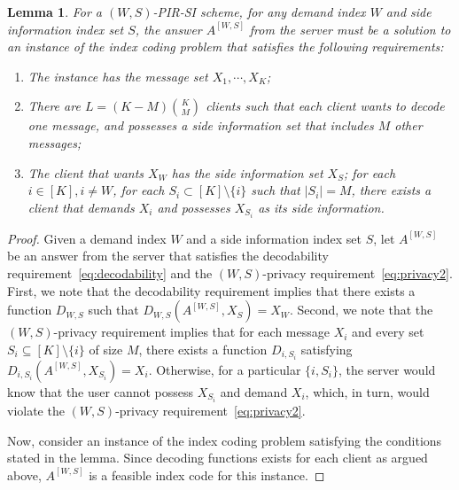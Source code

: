 \documentclass[letterpaper, 10 pt, conference]{ieeeconf}
\newtheorem{lemma}{Lemma}
\newcommand{\Xj}[1]{X_{#1}} %
\newcommand{\A}[2]{A^{[#1,#2]}} %
\begin{document}
\begin{lemma}
\label{lem:WSNecessaryCondition}
For a $(W,S)$-PIR-SI scheme, for any demand index $W$ and side information index set $S$, the answer $\A{W}{S}$ from the server must be a solution to an instance of the index coding problem that satisfies the following requirements:
\begin{enumerate}
	\item The instance has the message set $X_1, \cdots, X_K$;
	\item  There are $L = (K - M)\binom{K}{M}$ clients such that each client wants to decode one message, and possesses a side information set that includes $M$ other messages;
	\item  The client that wants $X_W$ has the side information set $X_S$; for each $i\in[K], i\ne W$, for each $S_i\subset[K]\setminus\{i\}$ such that $|S_i| = M$, there exists a client that demands $X_i$ and possesses $\Xj{S_i}$ as its side information.
\end{enumerate}
\end{lemma}

\begin{proof}
Given a demand index $W$ and a side information index set $S$, let $\A{W}{S}$ be an answer from the server that satisfies the decodability requirement~\eqref{eq:decodability} and the $(W,S)$-privacy requirement~\eqref{eq:privacy2}. First, we note that the decodability requirement implies that there exists a function $D_{W,S}$ such that $D_{W,S}\left(\A{W}{S},\Xj{S}\right) = X_W$. Second, we note that the $(W,S)$-privacy requirement implies that for each message $X_i$ and every set $S_i\subseteq[K]\setminus\{i\}$ of size $M$, there exists a function $D_{i,S_i}$ satisfying $D_{i,S_i}\left(\A{W}{S},\Xj{S_i}\right) = X_i$. Otherwise, for a particular $\{i,S_i\}$, the server would know that the user cannot possess $\Xj{S_i}$ and demand $\Xj{i}$, which, in turn, would violate the $(W,S)$-privacy requirement~\eqref{eq:privacy2}.  

Now, consider an instance of the index coding problem satisfying the conditions stated in the lemma. Since  decoding functions exists for each client as argued above, $\A{W}{S}$ is a feasible index code for this instance.  
\end{proof}
\end{document}

